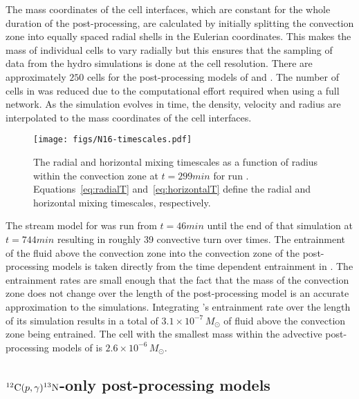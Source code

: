 \documentclass[fleqn,usenatbib]{mnras}
\newcommand{\cldfluid}{fluid above the convection zone}
\newcommand{\ppmstar}{\code{PPMstar}}
\begin{document}
The mass coordinates of the cell interfaces, which are constant for the whole
duration of the post-processing, are calculated by initially splitting the
convection zone into equally spaced radial shells in the Eulerian coordinates.
This makes the mass of individual cells to vary radially but this ensures that
the sampling of data from the hydro simulations is done at the cell resolution.
There are approximately $250$ cells for the post-processing models of 
and . The number of cells in  was reduced due to the
computational effort required when using a full network. As the \ppmstar{}
simulation evolves in time, the density, velocity and radius are interpolated to
the mass coordinates of the cell interfaces.

\begin{figure}

  \texttt{[image: figs/N16-timescales.pdf]}
  \centering
  \caption{The radial and horizontal mixing timescales as a function of radius
          within the convection zone at $t = \unit{299}{min}$ for run .
          Equations~\ref{eq:radialT} and~\ref{eq:horizontalT} define the radial and
          horizontal mixing timescales, respectively.}
  \label{fig:timescales}

\end{figure}

The stream model for  was run from $t = \unit{46}{min}$ until the end
of that simulation at $t = \unit{744}{min}$ resulting in roughly 39
convective turn over times. The entrainment of the \cldfluid{} into the
convection zone of the post-processing models is taken directly from the time
dependent entrainment in . The entrainment rates are small enough
that the fact that the mass of the convection zone does not change over the
length of the post-processing model is an accurate approximation to the
\ppmstar{} simulations. Integrating 's entrainment rate over the
length of its simulation results in a total of $3.1 \times 10^{-7}\,M_{\odot}$
of \cldfluid{} being entrained. The cell with the smallest mass within the
advective post-processing models of  is $2.6 \times 10^{-6}\,M_{\odot}$.

\subsection{$\mathrm{^{12}C}(p,\gamma)\mathrm{^{13}N}$-only post-processing models}
\label{sec:c12pg}
\end{document}
